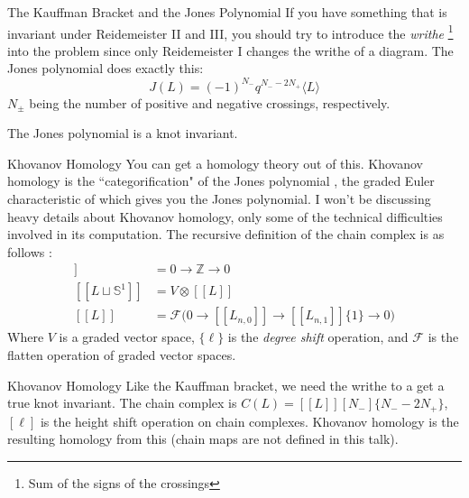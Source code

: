 \documentclass{beamer}
\begin{document}
    \begin{frame}{The Kauffman Bracket and the Jones Polynomial}
        If you have something that is invariant under Reidemeister II and III,
        you should try to introduce the \textit{writhe}%
        \footnote{Sum of the signs of the crossings}
        into the problem since only Reidemeister I changes the writhe of a
        diagram. The Jones polynomial does exactly this:
        \begin{equation}
            J(L)=(-1)^{N_{-}}q^{N_{-}-2N_{+}}\langle{L}\rangle
        \end{equation}
        $N_{\pm}$ being the number of positive and negative crossings,
        respectively.
        \begin{theorem}
            The Jones polynomial is a knot invariant.
        \end{theorem}
    \end{frame}
    \begin{frame}{Khovanov Homology}
        You can get a homology theory out of this. Khovanov homology is the
        ``categorification" of the Jones polynomial
        \cite{Khovanov1999CatJonesPoly}, the graded Euler
        characteristic of which gives you the Jones polynomial. I won't be
        discussing heavy details about Khovanov homology, only some of the
        technical difficulties involved in its computation.
        The recursive definition of the chain complex is as follows
        \cite[p.~338]{BarNatanKhovanovJones}:
        \begin{align}
            [[\emptyset]]&=0\rightarrow\mathbb{Z}\rightarrow{0}\\
            [[L\sqcup\mathbb{S}^{1}]]&=V\otimes[[L]]\\
            [[L]]&=\mathcal{F}\big(
                0\rightarrow[[L_{n,0}]]\rightarrow[[L_{n,1}]]\{1\}\rightarrow{0}
            \big)
        \end{align}
        Where $V$ is a graded vector space, $\{\ell\}$ is the
        \textit{degree shift} operation, and $\mathcal{F}$ is the flatten
        operation of graded vector spaces.
    \end{frame}
    \begin{frame}{Khovanov Homology}
        Like the Kauffman bracket, we need
        the writhe to a get a true knot invariant. The chain complex is
        $C(L)=[[L]][N_{-}]\{N_{-}-2N_{+}\}$, $[\ell]$ is the height shift
        operation on chain complexes. Khovanov homology is the resulting
        homology from this (chain maps are not defined in this talk).
    \end{frame}
\end{document}

